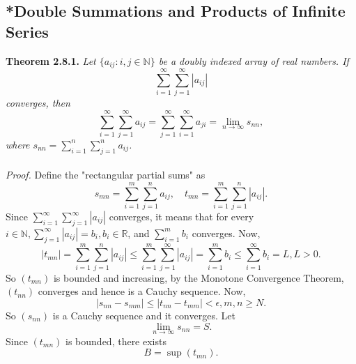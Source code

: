 \documentclass{article}
\begin{document}
            \subsection{*Double Summations and Products of Infinite Series}
            \textbf{Theorem 2.8.1.} \textit{Let $\{a_{ij}:i,j \in \mathbb{N}\}$ be a doubly indexed array of real numbers. If}
            \begin{equation*}
                \sum_{i=1}^\infty \sum_{j=1}^\infty |a_{ij}|
            \end{equation*}
            \textit{converges, then}
            \begin{equation*}
                \sum_{i=1}^\infty \sum_{j=1}^\infty a_{ij} = \sum_{j=1}^\infty \sum_{i=1}^\infty a_{ji} = \lim_{n \to \infty} s_{nn},
            \end{equation*}
            \textit{where $s_{nn} = \sum_{i=1}^n \sum_{j=1}^n a_{ij}$.}\\ \\
            \textit{Proof.} Define the "rectangular partial sums" as
            \begin{equation*}
                s_{mn}=\sum_{i=1}^m\sum_{j=1}^n a_{ij}, \quad t_{mn}=\sum_{i=1}^m\sum_{j=1}^n |a_{ij}|.
            \end{equation*}
            Since $\sum_{i=1}^\infty \sum_{j=1}^\infty |a_{ij}|$ converges, it means that for every $i \in \mathbb{N},\sum_{j=1}^\infty |a_{ij}|=b_i,b_i \in \mathbb{R}$, and $\sum_{i=1}^m b_i$ converges. Now, 
            \begin{equation*}
                |t_{mn}| = \sum_{i=1}^m\sum_{j=1}^n |a_{ij}| \leq \sum_{i=1}^m\sum_{j=1}^\infty |a_{ij}| = \sum_{i=1}^m b_i \leq \sum_{i=1}^\infty b_i = L, L>0.
            \end{equation*}
            So $(t_{mn})$ is bounded and increasing, by the Monotone Convergence Theorem, $(t_{nn})$ converges and hence is a Cauchy sequence. Now,
            \begin{equation*}
                |s_{nn} - s_{mm}| \leq |t_{nn} - t_{mm}| < \epsilon, m,n \geq N.
            \end{equation*}
            So $(s_{nn})$ is a Cauchy sequence and it converges. Let
            \begin{equation*}
                \lim_{n \to \infty} s_{nn} = S.
            \end{equation*}
            Since $(t_{mn})$ is bounded, there exists
            \begin{equation*}
                B = \sup(t_{mn}).
            \end{equation*}
\end{document}
